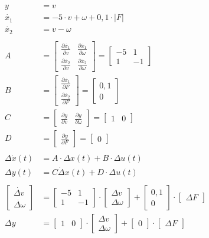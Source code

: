\documentclass{article}
\newcommand\mat[1]{\begin{bmatrix}#1\end{bmatrix}}
\newcommand\pdiff[2]{\frac{\partial #1}{\partial #2}}
\begin{document}
\begin{enumerate}
\begin{enumerate}
\begin{enumerate}
                        \begin{align*}
                            y &= v\\
                            \dot{x_1} &= -5 \cdot v + \omega + 0,1 \cdot |F|\\
                            \dot{x_2} &= v - \omega\\
                            \\
                            A &= \mat{\pdiff{\dot{x_1}}{v} & \pdiff{\dot{x_1}}{\omega}\\
                                      \pdiff{\dot{x_2}}{v} & \pdiff{\dot{x_2}}{\omega}} 
                               = \mat{-5 & 1\\
                                      1 & -1}\\
                            B &= \mat{\pdiff{\dot{x_1}}{F}\\
                                      \pdiff{\dot{x_2}}{F}}
                               = \mat{0,1\\
                                      0}\\
                            C &= \mat{\pdiff{y}{v} & \pdiff{y}{\omega}}
                               = \mat{1 & 0}\\
                            D &= \mat{\pdiff{y}{F}}
                               = \mat{0}\\
                            \\
                            \Delta \dot x(t) &= A \cdot \Delta x(t) + B \cdot \Delta u(t)\\
                            \Delta y(t) &= C \dot \Delta x(t) + D \cdot \Delta u(t)\\
                            \\
                            \mat{\dot{\Delta v}\\ \dot{\Delta \omega}} &= \mat{-5 & 1\\ 1 & -1} \cdot \mat{\Delta v\\ \Delta \omega} + \mat{0,1\\ 0} \cdot \mat{\Delta F}\\
                            \Delta y &= \mat{1 & 0} \cdot \mat{\Delta v\\ \Delta \omega} + \mat{0} \cdot \mat{\Delta F}\\
                        \end{align*}
    
                        
                \end{enumerate}
            

\end{enumerate}
\end{enumerate}
\end{document}
